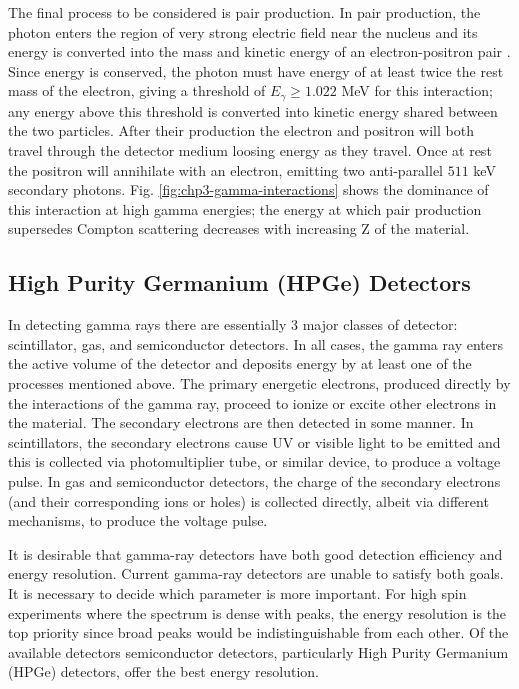 The final process to be considered is pair production. In pair production, the photon enters the region of very strong electric field near the nucleus and its energy is converted into the mass and kinetic energy of an electron-positron pair \cite{anderson-PhysRev.43.491,oppenheimer_PhysRev.44.53.2}. Since energy is conserved, the photon must have energy of at least twice the rest mass of the electron, giving a threshold of $E_{\gamma}\geq1.022$ MeV for this interaction; any energy above this threshold is converted into kinetic energy shared between the two particles. After their production the electron and positron will both travel through the detector medium loosing energy as they travel. Once at rest the positron will annihilate with an electron, emitting two anti-parallel $511$ keV secondary photons. Fig. \ref{fig:chp3-gamma-interactions} shows the dominance of this interaction at high gamma energies; the energy at which pair production supersedes Compton scattering decreases with increasing Z of the material.

\subsection{High Purity Germanium (HPGe) Detectors}
\label{ssec:exp-pr-gamma-spec-hpge}
In detecting gamma rays there are essentially 3 major classes of detector: scintillator, gas, and semiconductor detectors. In all cases, the gamma ray enters the active volume of the detector and deposits energy by at least one of the processes mentioned above. The primary energetic electrons, produced directly by the interactions of the gamma ray, proceed to ionize or excite other electrons in the material. The secondary electrons are then detected in some manner. In scintillators, the secondary electrons cause UV or visible light to be emitted and this is collected via photomultiplier tube, or similar device, to produce a voltage pulse. In gas and semiconductor detectors, the charge of the secondary electrons (and their corresponding ions or holes) is collected directly, albeit via different mechanisms, to produce the voltage pulse.

It is desirable that gamma-ray detectors have both good detection efficiency and energy resolution. Current gamma-ray detectors are unable to satisfy both goals. It is necessary to decide which parameter is more important. For high spin experiments where the spectrum is dense with peaks, the energy resolution is the top priority since broad peaks would be indistinguishable from each other. Of the available detectors semiconductor detectors, particularly High Purity Germanium (HPGe) detectors, offer the best energy resolution.

